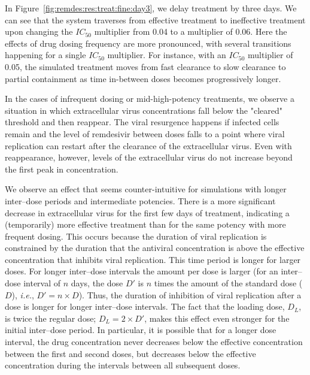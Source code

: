  In Figure~\ref{fig:remdes:res:treat:fine:day3}, we delay treatment by three days. We can see that the system traverses from effective treatment to ineffective treatment upon changing the $IC_{50}$ multiplier from 0.04 to a multiplier of 0.06. Here the effects of drug dosing frequency are more pronounced, with several transitions happening for a single $IC_{50}$ multiplier. For instance, with an $IC_{50}$ multiplier of 0.05, the simulated treatment moves from fast clearance to slow clearance to partial containment as time in-between doses becomes progressively longer. 
 
 
 
In the cases of infrequent dosing or mid-high-potency treatments, we observe a situation in which extracellular virus concentrations fall below the "cleared" threshold and then reappear. The viral resurgence happens if infected cells remain and the level of remdesivir between doses falls to a point where viral replication can restart after the clearance of the extracellular virus. Even with reappearance, however, levels of the extracellular virus do not increase beyond the first peak in concentration. 

We observe an effect that seems counter-intuitive for simulations with longer inter--dose periods and intermediate potencies. There is a more significant decrease in extracellular virus for the first few days of treatment, indicating a (temporarily) more effective treatment than for the same potency with more frequent dosing. This occurs because the duration of viral replication is constrained by the duration that the antiviral concentration is above the effective concentration that inhibits viral replication. This time period is longer for larger doses. For longer inter--dose intervals the amount per dose is larger (for an inter--dose interval of $n$ days, the dose $D'$ is $n$ times the amount of the standard dose ($D$), \textit{i.e.}, $D' = n \times D$). Thus, the duration of inhibition of viral replication after a dose is longer for longer inter--dose intervals. The fact that the loading dose, $D_L$, is twice the regular dose; $D_L= 2 \times D'$, makes this effect even stronger for the initial inter--dose period. In particular, it is possible that for a longer dose interval, the drug concentration never decreases below the effective concentration between the first and second doses, but decreases below the effective concentration during the intervals between all subsequent doses.


